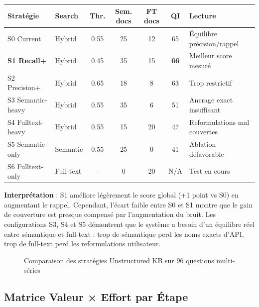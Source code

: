 \documentclass[12pt,a4paper]{report}
\begin{document}
\begin{longtable}{p{2cm}p{2.2cm}ccccp{4cm}}
\toprule
\textbf{Stratégie} & \textbf{Search} & \textbf{Thr.} & \textbf{Sem. docs} & \textbf{FT docs} & \textbf{QI} & \textbf{Lecture} \\
\midrule
S0 Current & Hybrid & 0.55 & 25 & 12 & 65 & Équilibre précision/rappel \\
\textbf{S1 Recall+} & Hybrid & 0.45 & 35 & 15 & \textbf{66} & Meilleur score mesuré \\
S2 Precision+ & Hybrid & 0.65 & 18 & 8 & 63 & Trop restrictif \\
S3 Semantic-heavy & Hybrid & 0.55 & 35 & 6 & 51 & Ancrage exact insuffisant \\
S4 Fulltext-heavy & Hybrid & 0.55 & 15 & 20 & 47 & Reformulations mal couvertes \\
S5 Semantic-only & Semantic & 0.55 & 25 & 0 & 41 & Ablation défavorable \\
S6 Fulltext-only & Full-text & -- & 0 & 20 & N/A & Test en cours \\
\bottomrule
\end{longtable}

\textbf{Interprétation} : S1 améliore légèrement le score global (+1 point vs S0) en augmentant le rappel. Cependant, l'écart faible entre S0 et S1 montre que le gain de couverture est presque compensé par l'augmentation du bruit. Les configurations S3, S4 et S5 démontrent que le système a besoin d'un équilibre réel entre sémantique et full-text : trop de sémantique perd les noms exacts d'API, trop de full-text perd les reformulations utilisateur.

\begin{figure}[H]
\centering
{}
\caption{Comparaison des stratégies Unstructured KB sur 96 questions multi-séries}
\label{fig:qi_evolution_dead}
\end{figure}

\subsection{Matrice Valeur × Effort par Étape}
\end{document}
